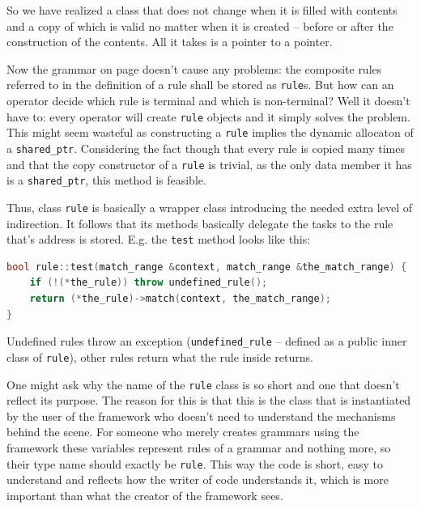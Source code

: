 \documentclass[12pt]{article}
\begin{document}
So we have realized a class that does not change when it is filled with contents and a copy of which is valid
no matter when it is created -- before or after the construction of the contents. All it takes is a pointer to
a pointer.

Now the grammar on page \pageref{lst:numberedexpressiongrammar} doesn't cause any problems: the composite
rules referred to in the definition of a rule shall be stored as \texttt{rule}s. But how can an operator
decide which rule is terminal and which is non-terminal? Well it doesn't have to: every operator will create
\texttt{rule} objects and it simply solves the problem. This might seem wasteful as constructing a
\texttt{rule} implies the dynamic allocaton of a \texttt{shared\_ptr}. Considering the fact though that every
rule is copied many times and that the copy constructor of a \texttt{rule} is trivial, as the only data member
it has is a \texttt{shared\_ptr}, this method is feasible.

Thus, class \texttt{rule} is basically a wrapper class introducing the needed extra level of indirection. It
follows that its methods basically delegate the tasks to the rule that's address is stored. E.g. the
\texttt{test} method looks like this:

\begin{center}
	\begin{minipage}[h]{0.8\textwidth}
		\begin{lstlisting}[language=C++, breaklines=true]
bool rule::test(match_range &context, match_range &the_match_range) {
	if (!(*the_rule)) throw undefined_rule();
	return (*the_rule)->match(context, the_match_range);
}
		\end{lstlisting}
	\end{minipage}
\end{center}

Undefined rules throw an exception (\texttt{undefined\_rule} -- defined as a public inner class of
\texttt{rule}), other rules return what the rule inside returns.

\vspace{0.8em}
One might ask why the name of the \texttt{rule} class is so short and one that doesn't reflect its purpose.
The reason for this is that this is the class that is instantiated by the user of the framework who doesn't
need to understand the mechanisms behind the scene. For someone who merely creates grammars using the
framework these variables represent rules of a grammar and nothing more, so their type name should exactly be
\texttt{rule}. This way the code is short, easy to understand and reflects how the writer of code understands
it, which is more important than what the creator of the framework sees.
\end{document}
